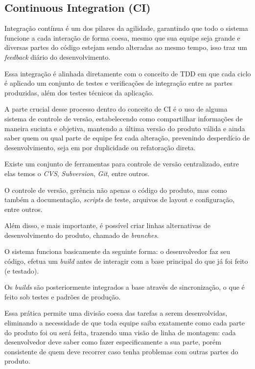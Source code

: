 \subsection{Continuous Integration (CI)}
\par Integração contínua é um dos pilares da agilidade, garantindo que todo o sistema funcione a cada interação de forma coesa, mesmo que sua equipe seja grande e diversas partes do código estejam sendo alteradas ao mesmo tempo, isso traz um \emph{feedback} diário do desenvolvimento.
\par Essa integração é alinhada diretamente com o conceito de TDD em que cada ciclo é aplicado um conjunto de testes e verificações de integração entre as partes produzidas, além dos testes técnicos da aplicação.
\par A parte crucial desse processo dentro do conceito de CI é o uso de alguma sistema de controle de versão, estabelecendo como compartilhar informações de maneira sucinta e objetiva, mantendo a última versão do produto válida e ainda saber quem ou qual parte de equipe fez cada alteração, prevenindo desperdício de desenvolvimento, seja em por duplicidade ou refatoração direta.
\par Existe um conjunto de ferramentas para controle de versão centralizado, entre elas temos o \emph{CVS}, \emph{Subversion}, \emph{Git}, entre outros.
\par O controle de versão, gerência não apenas o código do produto, mas como também a documentação, \emph{scripts} de teste, arquivos de layout e configuração, entre outros.
\par Além disso, e mais importante, é possível criar linhas alternativas de desenvolvimento do produto, chamado de \emph{branches}.
\par  O sistema funciona basicamente da seguinte forma: o desenvolvedor faz seu código, efetua um \emph{build} antes de interagir com a base principal do que já foi feito (e testado).
\par Os \emph{builds} são posteriormente integrados a base através de sincronização, o que é feito sob testes e padrões de produção.
\par Essa prática permite uma divisão coesa das tarefas a serem desenvolvidas, eliminando a necessidade de que toda equipe saiba exatamente como cada parte do produto foi ou será feita, trazendo uma visão de linha de montagem: cada desenvolvedor deve saber como fazer especificamente a sua parte, porém consistente de quem deve recorrer caso tenha problemas com outras partes do produto.
